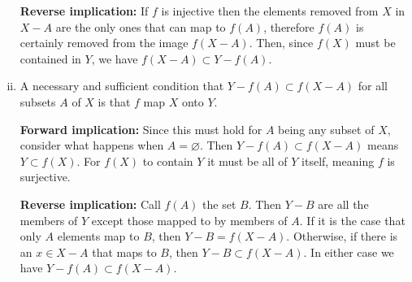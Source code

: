 \documentclass{article}
\begin{document}
\begin{enumerate}[(i)]
    \textbf{Reverse implication:} If $f$ is injective then the elements removed from $X$ in $X - A$ are the only ones that can map to $f(A)$, therefore $f(A)$ is certainly removed from the image $f(X - A)$. Then, since $f(X)$ must be contained in $Y$, we have $f(X - A) \subset Y - f(A)$.

    \item A necessary and sufficient condition that $Y - f(A) \subset f(X - A)$ for all subsets $A$ of $X$ is that $f$ map $X$ onto $Y$.
    
    \textbf{Forward implication:} Since this must hold for $A$ being any subset of $X$, consider what happens when $A = \varnothing$. Then $Y - f(A) \subset f(X - A)$ means $Y \subset f(X)$. For $f(X)$ to contain $Y$ it must be all of $Y$ itself, meaning $f$ is surjective.

    \textbf{Reverse implication:} Call $f(A)$ the set $B$. Then $Y - B$ are all the members of $Y$ except those mapped to by members of $A$. If it is the case that only $A$ elements map to $B$, then $Y - B = f(X - A)$. Otherwise, if there is an $x \in X - A$ that maps to $B$, then $Y - B \subset f(X - A)$. In either case we have $Y - f(A) \subset f(X - A)$.

   
\end{enumerate}
\end{document}
